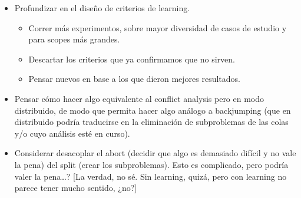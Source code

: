 \begin{itemize}
\item Profundizar en el diseño de criterios de learning.

	\begin{itemize}
	\item Correr más experimentos, sobre mayor diversidad de casos de estudio y para scopes más grandes.
	\item Descartar los criterios que ya confirmamos que no sirven.
	\item Pensar nuevos en base a los que dieron mejores resultados. 
	\end{itemize}

\item Pensar cómo hacer algo equivalente al conflict analysis pero en modo distribuido, de modo que permita hacer algo análogo a backjumping (que en distribuido podría traducirse en la eliminación de subproblemas de las colas y/o cuyo análisis esté en curso).

\item Considerar desacoplar el abort (decidir que algo es demasiado difícil y no vale la pena) del split (crear los subproblemas). Esto es complicado, pero podría valer la pena\ldots? [La verdad, no sé. Sin learning, quizá, pero con learning no parece tener mucho sentido, ¿no?]

\end{itemize}

